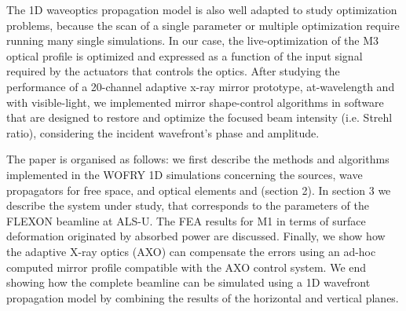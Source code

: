 \documentclass[]{spie}  %
\begin{document}
The 1D waveoptics propagation model is also well adapted to study optimization problems, because the scan of a single parameter or multiple optimization require running many single simulations. In our case, the live-optimization of the M3 optical profile is optimized and expressed as a function of the input signal required by the actuators that controls the optics. 
After studying the performance of a 20-channel adaptive x-ray mirror prototype, at-wavelength and with visible-light, we implemented mirror shape-control algorithms in software that are designed to restore and optimize the focused beam intensity (i.e. Strehl ratio), considering the incident wavefront’s phase and amplitude.


The paper is organised as follows: we first describe the methods and algorithms implemented in the WOFRY 1D simulations concerning the sources, wave propagators for free space, and optical elements and (section 2). In section 3 we describe the system under study, that corresponds to the parameters of the FLEXON beamline at ALS-U. The FEA results for M1 in terms of surface deformation originated by absorbed power are discussed. Finally, we show how the adaptive X-ray optics (AXO) can compensate the errors using an ad-hoc computed mirror profile compatible with the AXO control system. We end showing how the complete beamline can be simulated using a 1D wavefront propagation model by combining the results of the horizontal and vertical planes.  

\end{document}
